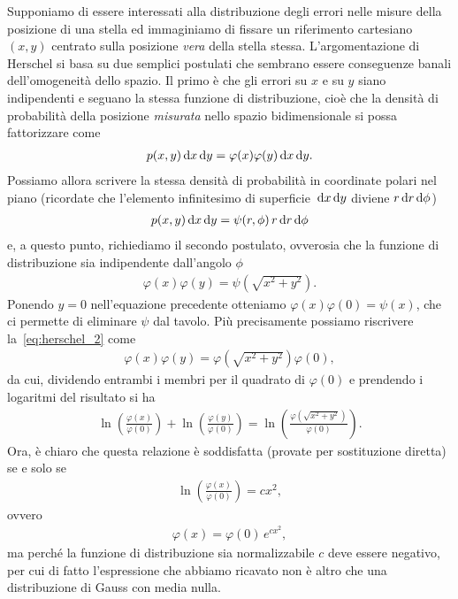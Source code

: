 Supponiamo di essere interessati alla distribuzione degli errori nelle misure
della posizione di una stella ed immaginiamo di fissare un riferimento
cartesiano $(x,y)$ centrato sulla posizione \emph{vera} della stella stessa.
L'argomentazione di Herschel si basa su due semplici postulati che sembrano
essere conseguenze banali dell'omogeneità dello spazio. Il primo è che
gli errori su $x$ e su $y$ siano indipendenti e seguano la stessa funzione di
distribuzione, cioè che la densità di probabilità della posizione
\emph{misurata} nello spazio bidimensionale si possa fattorizzare come
\begin{align}
  p(x,y) \diff[x] \diff[y] = \varphi(x)\varphi(y)\diff[x]\diff[y].
\end{align}
Possiamo allora scrivere la stessa densità di probabilità in coordinate
polari nel piano (ricordate che l'elemento infinitesimo di superficie
$\diff[x] \diff[y]$ diviene $r\diff[r]\diff[\phi]$)
\begin{align*}
  p(x,y) \diff[x] \diff[y] = \psi(r, \phi)\,r\diff[r]\diff[\phi]
\end{align*}
e, a questo punto, richiediamo il secondo postulato, ovverosia che
la funzione di distribuzione sia indipendente dall'angolo $\phi$
\begin{align}\label{eq:herschel_2}
  \varphi(x)\varphi(y) = \psi\left(\sqrt{x^2 + y^2}\right).
\end{align}
Ponendo $y = 0$ nell'equazione precedente otteniamo
$\varphi(x)\varphi(0) = \psi(x)$, che ci permette di eliminare $\psi$ dal
tavolo. Più precisamente possiamo riscrivere la~\eqref{eq:herschel_2} come
\begin{align*}
  \varphi(x)\varphi(y) = \varphi\left(\sqrt{x^2 + y^2}\right) \varphi(0),
\end{align*}
da cui, dividendo entrambi i membri per il quadrato di $\varphi(0)$ e prendendo
i logaritmi del risultato si ha
\begin{align}
  \ln\left(\frac{\varphi(x)}{\varphi(0)}\right) +
  \ln\left(\frac{\varphi(y)}{\varphi(0)}\right) =
  \ln\left(\frac{\varphi\left(\sqrt{x^2 + y^2}\right)}{\varphi(0)}\right).
\end{align}
Ora, è chiaro che questa relazione è soddisfatta (provate per sostituzione
diretta) se e solo se
\begin{align*}
  \ln\left(\frac{\varphi(x)}{\varphi(0)}\right) = c x^2,
\end{align*}
ovvero
\begin{align}
  \varphi(x) = \varphi(0)\,e^{c x^2},
\end{align}
ma perché la funzione di distribuzione sia normalizzabile $c$ deve essere
negativo, per cui di fatto l'espressione che abbiamo ricavato non è altro
che una distribuzione di Gauss con media nulla.


